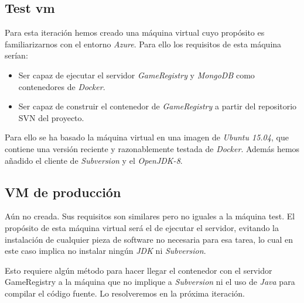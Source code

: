 \subsection{Test vm}
Para esta iteración hemos creado una máquina virtual cuyo propósito es familiarizarnos
con el entorno \emph{Azure}. Para ello los requisitos de esta máquina serían:

\begin{itemize}
 \item Ser capaz de ejecutar el servidor \emph{GameRegistry} y \emph{MongoDB} como
       contenedores de \emph{Docker}.
 \item Ser capaz de construir el contenedor de \emph{GameRegistry} a partir del 
       repositorio SVN del proyecto.
\end{itemize}

Para ello se ha basado la máquina virtual en una imagen de \emph{Ubuntu 15.04}, que contiene
una versión reciente y razonablemente testada de \emph{Docker}. Además hemos añadido
el cliente de \emph{Subversion} y el \emph{OpenJDK-8}.


\subsection{VM de producción}
Aún no creada. Sus requisitos son similares pero no iguales a la máquina test. El propósito
de esta máquina virtual será el de ejecutar el servidor, evitando la instalación
de cualquier pieza de software no necesaria para esa tarea, lo cual en este caso implica
no instalar ningún \emph{JDK} ni \emph{Subversion}.

Esto requiere algún método para hacer llegar el contenedor con el servidor GameRegistry a
la máquina que no implique a \emph{Subversion} ni el uso de \emph{Java} para compilar
el código fuente. Lo resolveremos en la próxima iteración.

